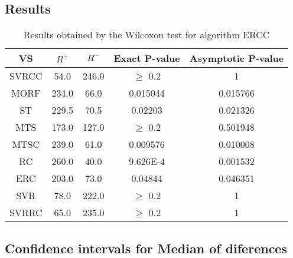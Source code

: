 \documentclass[a4paper,10pt]{article}
\begin{document}
\subsection{Results}

\begin{table}[!htp]
\centering\small
\begin{tabular}{
|c|c|c|c|c|}
\hline
 VS & $R^{+}$ & $R^{-}$ & Exact P-value & Asymptotic P-value \\ \hline 
SVRCC & 54.0 & 246.0 & $\geq$ 0.2 & 1\\ \hline 
MORF & 234.0 & 66.0 & 0.015044 & 0.015766\\ \hline 
ST & 229.5 & 70.5 & 0.02203 & 0.021326\\ \hline 
MTS & 173.0 & 127.0 & $\geq$ 0.2 & 0.501948\\ \hline 
MTSC & 239.0 & 61.0 & 0.009576 & 0.010008\\ \hline 
RC & 260.0 & 40.0 & 9.626E-4 & 0.001532\\ \hline 
ERC & 203.0 & 73.0 & 0.04844 & 0.046351\\ \hline 
SVR & 78.0 & 222.0 & $\geq$ 0.2 & 1\\ \hline 
SVRRC & 65.0 & 235.0 & $\geq$ 0.2 & 1\\ \hline 

\end{tabular}
\caption{Results obtained by the Wilcoxon test for algorithm ERCC}
\end{table}

\subsection{Confidence intervals for Median of diferences}
\end{document}
